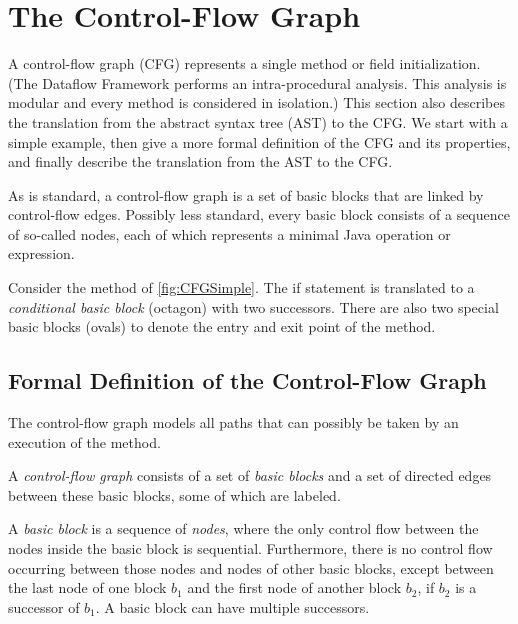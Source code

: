 \section{The Control-Flow Graph}
\label{sec:cfg}

A control-flow graph (CFG) represents a single method or field
initialization.  (The Dataflow Framework performs an intra-procedural
analysis.  This analysis is modular and every method is considered in
isolation.)
This section also describes the translation from the abstract syntax tree
(AST) to the CFG\@.
We start with a simple example, then give a more formal
definition of the CFG and its properties, and finally describe the
translation from the AST to the CFG.

As is standard, a control-flow graph is a set of
basic blocks that are linked by control-flow edges. Possibly less
standard, every basic block consists of a sequence of so-called nodes,
each of which represents a minimal Java operation or expression.



Consider the method  of \autoref{fig:CFGSimple}. The if
statement is translated to a \emph{conditional basic block}
(octagon) with two successors. There are also two special basic blocks
(ovals) to denote the entry and exit point of the method.


\subsection{Formal Definition of the Control-Flow Graph}
\label{sec:cfg-formal}

The control-flow graph models all paths that can possibly be taken by an
execution of the method.

\begin{definition}
    A \emph{control-flow graph} consists of a set of \emph{basic
      blocks} and a set of directed edges between these basic blocks,
    some of which are labeled.
\end{definition}

\begin{definition}
    A \emph{basic block} is a sequence of \emph{nodes}, where the only
    control flow between the nodes inside
    the basic block is sequential.  Furthermore, there is no
    control flow occurring between those nodes and nodes of other basic
    blocks, except between the last node of one block $b_1$ and the first node
    of another block $b_2$, if $b_2$ is a successor of $b_1$.  A basic
    block can have multiple successors.
\end{definition}



